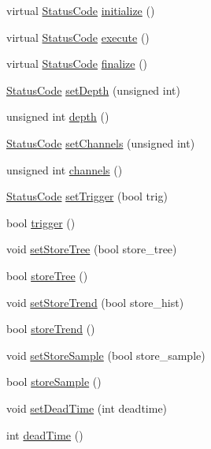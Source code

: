 \begin{DoxyCompactItemize}
virtual \hyperlink{classStatusCode}{Status\+Code} \hyperlink{classAcquisition_aa73eec1ec46deae89bd3c25551bad86e}{initialize} ()
\item 
virtual \hyperlink{classStatusCode}{Status\+Code} \hyperlink{classAcquisition_a6cae797f591c2c576ebf17411e5212c9}{execute} ()
\item 
virtual \hyperlink{classStatusCode}{Status\+Code} \hyperlink{classAcquisition_a92b4b55e8c7d53610e7eda6d5b9c74a4}{finalize} ()
\item 
\hyperlink{classStatusCode}{Status\+Code} \hyperlink{classAcquisition_a303145d497f99da966fcfd95c00cd81e}{set\+Depth} (unsigned int)
\item 
unsigned int \hyperlink{classAcquisition_a1ad973e21a067c0de0b6264d0eb5182b}{depth} ()
\item 
\hyperlink{classStatusCode}{Status\+Code} \hyperlink{classAcquisition_a3ee93f665573b4622bd9cba92c0cc04e}{set\+Channels} (unsigned int)
\item 
unsigned int \hyperlink{classAcquisition_a3041537afcb4dfe5c6940f0ef6829265}{channels} ()
\item 
\hyperlink{classStatusCode}{Status\+Code} \hyperlink{classAcquisition_acdb167b43f3babb59a98698aa5c5066f}{set\+Trigger} (bool trig)
\item 
bool \hyperlink{classAcquisition_a6f680938eb6a42d57dfa7466e8852af9}{trigger} ()
\item 
void \hyperlink{classAcquisition_a759193856d26354722e5f647e60e16de}{set\+Store\+Tree} (bool store\+\_\+tree)
\item 
bool \hyperlink{classAcquisition_a8ab7e58ccb3fee54eb6850e5081fae10}{store\+Tree} ()
\item 
void \hyperlink{classAcquisition_a1ceff272a1ad030dcd20c0dcddc65443}{set\+Store\+Trend} (bool store\+\_\+hist)
\item 
bool \hyperlink{classAcquisition_a5af693448daef6e9e054ab7f1aa50784}{store\+Trend} ()
\item 
void \hyperlink{classAcquisition_af36a1b660244096b7d274f591f67b695}{set\+Store\+Sample} (bool store\+\_\+sample)
\item 
bool \hyperlink{classAcquisition_a9af304e0fb2076cd4f92703708efe83e}{store\+Sample} ()
\item 
void \hyperlink{classAcquisition_a37e05315fc47958c290a7d938c61e067}{set\+Dead\+Time} (int deadtime)
\item 
int \hyperlink{classAcquisition_a8fb2cd60a34993ab0952d719a8517831}{dead\+Time} ()
\item 

\end{DoxyCompactItemize}

